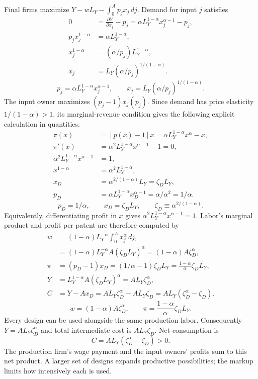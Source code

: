 Final firms maximize $Y-wL_Y-\int_0^A p_jx_j\,dj$.
Demand for input $j$ satisfies
\begin{align}
0&=\frac{\partial Y}{\partial x_j}-p_j
   =\alpha L_Y^{1-\alpha}x_j^{\alpha-1}-p_j,\\
p_jx_j^{1-\alpha}&=\alpha L_Y^{1-\alpha},\\
x_j^{1-\alpha}&=(\alpha/p_j)L_Y^{1-\alpha},\\
x_j&=L_Y(\alpha/p_j)^{1/(1-\alpha)}.
\end{align}
\begin{equation}
p_j=\alpha L_Y^{1-\alpha}x_j^{\alpha-1},\qquad
x_j=L_Y(\alpha/p_j)^{1/(1-\alpha)}.
\end{equation}
The input owner maximizes $(p_j-1)x_j(p_j)$. Since demand has price elasticity
$1/(1-\alpha)>1$, its marginal-revenue condition gives
the following explicit calculation in quantities:
\begin{align}
\pi(x)&=[p(x)-1]x=\alpha L_Y^{1-\alpha}x^\alpha-x,\\
\pi'(x)&=\alpha^2L_Y^{1-\alpha}x^{\alpha-1}-1=0,\\
\alpha^2L_Y^{1-\alpha}x^{\alpha-1}&=1,\\
x^{1-\alpha}&=\alpha^2L_Y^{1-\alpha},\\
x_D&=\alpha^{2/(1-\alpha)}L_Y=\zeta_D L_Y,\\
p_D&=\alpha L_Y^{1-\alpha}x_D^{\alpha-1}
     =\alpha/\alpha^2=1/\alpha.
\end{align}
\begin{equation}\label{eq:eg-idea-markup}
p_D=1/\alpha,\qquad x_D=\zeta_D L_Y,\qquad
\zeta_D\equiv\alpha^{2/(1-\alpha)}.
\end{equation}
Equivalently, differentiating profit in $x$ gives
$\alpha^2L_Y^{1-\alpha}x^{\alpha-1}=1$. Labor's marginal product and profit
per patent are therefore
computed by
\begin{align}
w&=(1-\alpha)L_Y^{-\alpha}\int_0^A x_j^\alpha\,dj,\\
 &=(1-\alpha)L_Y^{-\alpha}A(\zeta_D L_Y)^\alpha
  =(1-\alpha)A\zeta_D^\alpha,\\
\pi&=(p_D-1)x_D
   =(1/\alpha-1)\zeta_D L_Y
   =\frac{1-\alpha}{\alpha}\zeta_D L_Y,\\
Y&=L_Y^{1-\alpha}A(\zeta_D L_Y)^\alpha
  =AL_Y\zeta_D^\alpha,\\
C&=Y-Ax_D=AL_Y\zeta_D^\alpha-AL_Y\zeta_D
  =AL_Y(\zeta_D^\alpha-\zeta_D).
\end{align}
\begin{equation}\label{eq:eg-idea-wage-profit}
w=(1-\alpha)A\zeta_D^\alpha,\qquad
\pi=\frac{1-\alpha}{\alpha}\zeta_D L_Y.
\end{equation}
Every design can be used alongside the same production labor. Consequently
$Y=A L_Y\zeta_D^\alpha$ and total intermediate cost is $A L_Y\zeta_D$.
Net consumption is
\begin{equation}\label{eq:eg-idea-net-output}
C=A L_Y(\zeta_D^\alpha-\zeta_D)>0.
\end{equation}
The production firm's wage payment and the input owners' profits sum to this
net product. A larger set of designs expands productive possibilities; the
markup limits how intensively each is used.

